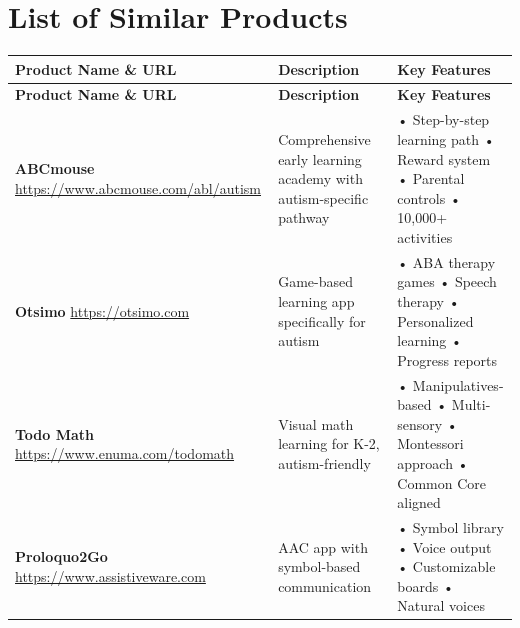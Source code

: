 \documentclass[12pt, a4paper]{article}
\begin{document}
\section{List of Similar Products}

\begin{longtable}{|>{\raggedright}p{5cm}|>{\raggedright}p{4cm}|>{\raggedright\arraybackslash}p{5cm}|}
\hline
\rowcolor{stargold!30}
\textbf{Product Name \& URL} & \textbf{Description} & \textbf{Key Features} \\
\hline
\endfirsthead

\hline
\rowcolor{stargold!30}
\textbf{Product Name \& URL} & \textbf{Description} & \textbf{Key Features} \\
\hline
\endhead

\hline
\endfoot

\textbf{ABCmouse} \newline \url{https://www.abcmouse.com/abl/autism} & Comprehensive early learning academy with autism-specific pathway & • Step-by-step learning path \newline • Reward system \newline • Parental controls \newline • 10,000+ activities \\
\hline

\textbf{Otsimo} \newline \url{https://otsimo.com} & Game-based learning app specifically for autism & • ABA therapy games \newline • Speech therapy \newline • Personalized learning \newline • Progress reports \\
\hline

\textbf{Todo Math} \newline \url{https://www.enuma.com/todomath} & Visual math learning for K-2, autism-friendly & • Manipulatives-based \newline • Multi-sensory \newline • Montessori approach \newline • Common Core aligned \\
\hline

\textbf{Proloquo2Go} \newline \url{https://www.assistiveware.com} & AAC app with symbol-based communication & • Symbol library \newline • Voice output \newline • Customizable boards \newline • Natural voices \\
\hline


\end{longtable}
\end{document}
